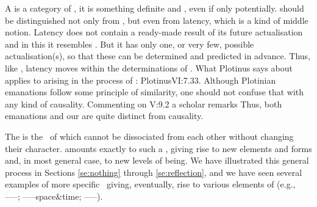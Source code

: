 {  A  is a category of , it is something definite
  and , even if only potentially.
   should be distinguished not only from , but
  even from latency, which is a kind of middle notion. Latency does not contain
  a ready-made result of its future actualisation and in this it resembles
  . But it has only one, or very few, possible actualisation(s),
  so that these can be determined and predicted in advance. Thus, like
  , latency moves within the determinations of
  . \label{ftnt:artist} }
%
What Plotinus says about  applies to  arising in the
process of : \citet{Form is only a trace of that which has no
  form: indeed, it is the latter which engenders form.}{Plotinus}{VI:7.33.
  Although Plotinian emanations follow some principle of similarity, one should
  not confuse that with any kind of causality. Commenting on V:9.2   a scholar remarks  Thus, both emanations and our
   are quite distinct from causality.}

\newp

\pa\label{pa:nexus}
The  is the \nexus\ of  which cannot be
{dissociated} from each other without changing their
character.  amounts exactly to such a ,
giving rise to new elements and forms and, in most general case, to new levels
of being. We have illustrated this general process in Sections \ref{se:nothing}
through \ref{se:reflection}, and we have seen several examples of more specific
\nexuss\ giving, eventually, rise to various elements of
 (e.g., ------;
------space\&time;
------).

